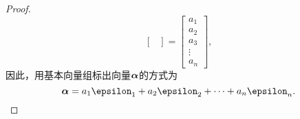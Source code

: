 \begin{theorem}
\begin{proof}
\begin{equation*}
\begin{bmatrix}
	\end{bmatrix}
	= \begin{bmatrix}
		a_1 \\ a_2 \\ a_3 \\ \vdots \\ a_n
	\end{bmatrix},
\end{equation*}
因此，用基本向量组标出向量\(\boldsymbol\alpha\)的方式为\begin{equation*}
	\vb\alpha = a_1 \vb\epsilon_1 + a_2 \vb\epsilon_2 + \dotsb + a_n \vb\epsilon_n.
	\qedhere
\end{equation*}
\end{proof}
\end{theorem}
